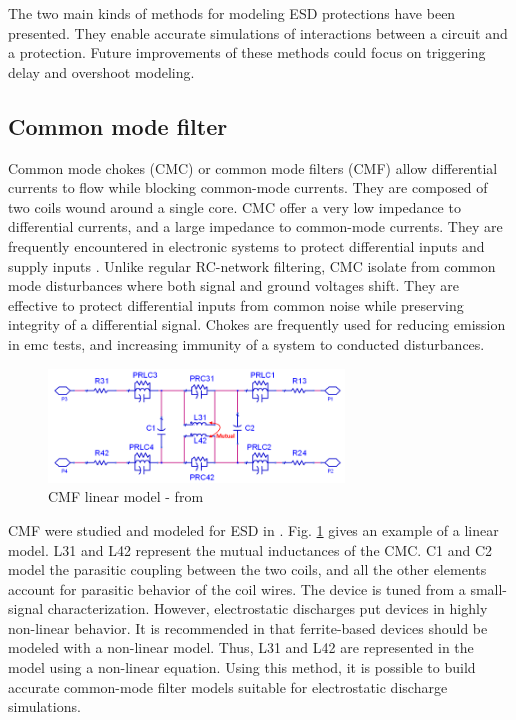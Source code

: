 The two main kinds of methods for modeling ESD protections have been presented.
They enable accurate simulations of interactions between a circuit and a protection.
Future improvements of these methods could focus on triggering delay and overshoot modeling.

\subsection{Common mode filter}

Common mode chokes (CMC) or common mode filters (CMF) allow differential currents to flow while blocking common-mode currents.
They are composed of two coils wound around a single core.
CMC offer a very low impedance to differential currents, and a large impedance to common-mode currents.
They are frequently encountered in electronic systems to protect differential inputs and supply inputs \cite{cmc-for-emc-protection, cmc-esd, alternative-cmc-emi-noise}.
Unlike regular RC-network filtering, CMC isolate from common mode disturbances where both signal and ground voltages shift.
They are effective to protect differential inputs from common noise while preserving integrity of a differential signal.
Chokes are frequently used for reducing emission in \gls{emc} tests, and increasing immunity of a system to conducted disturbances.

\begin{figure}[!h]
  \centering
  \includegraphics[width=0.7\textwidth]{src/2/figures/cmc.png}
  \caption{CMF linear model - from \cite{usb2ESDProtection}}
  \label{fig:cmf-model}
\end{figure}

CMF were studied and modeled for ESD in \cite{usb2ESDProtection}.
Fig. \ref{fig:cmf-model} gives an example of a linear model.
L31 and L42 represent the mutual inductances of the CMC.
C1 and C2 model the parasitic coupling between the two coils, and all the other elements account for parasitic behavior of the coil wires.
The device is tuned from a small-signal characterization.
However, electrostatic discharges put devices in highly non-linear behavior.
It is recommended in \cite{esd-codesign} that ferrite-based devices should be modeled with a non-linear model.
Thus, L31 and L42 are represented in the model using a non-linear equation.
Using this method, it is possible to build accurate common-mode filter models suitable for electrostatic discharge simulations.


